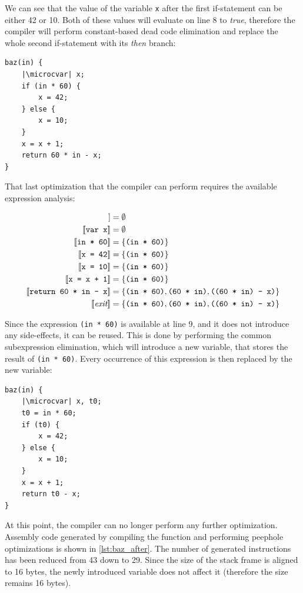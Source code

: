 \documentclass[thesis=M,english]{FITthesis}[2019/12/23]
\newcommand{\microcvar}{\textcolor{codegreen}{\textbf{var}}}
\begin{document}
We can see that the value of the variable \texttt{x} after the first if-statement can be either 42 or 10. Both of these values will evaluate on line 8 to \emph{true}, therefore the compiler will perform constant-based dead code elimination and replace the whole second if-statement with its \emph{then} branch:

\begin{verbatim}
baz(in) {
	|\microcvar| x;
    if (in * 60) {
		x = 42;
	} else {
		x = 10;
	}
	x = x + 1;
	return 60 * in - x;
}
\end{verbatim}

That last optimization that the compiler can perform requires the available expression analysis:

\begin{align*}
    [\![ \emph{entry} ]\!] &= \emptyset\\
    [\![ \texttt{var x} ]\!] &= \emptyset\\
    [\![ \texttt{in * 60} ]\!] &= \{ \texttt{(in * 60)} \}\\
    [\![ \texttt{x = 42} ]\!] &= \{ \texttt{(in * 60)} \}\\
    [\![ \texttt{x = 10} ]\!] &= \{ \texttt{(in * 60)} \}\\
    [\![ \texttt{x = x + 1} ]\!] &= \{ \texttt{(in * 60)} \}\\
    [\![ \texttt{return 60 * in - x} ]\!] &= \{ \texttt{(in * 60)}, \texttt{(60 * in)}, \texttt{((60 * in) - x)} \}\\
    [\![ \emph{exit} ]\!] &= \{ \texttt{(in * 60)}, \texttt{(60 * in)}, \texttt{((60 * in) - x)} \}\\
\end{align*}

Since the expression \texttt{(in * 60)} is available at line 9, and it does not introduce any side-effects, it can be reused. This is done by performing the common subexpression elimination, which will introduce a new variable, that stores the result of \texttt{(in * 60)}. Every occurrence of this expression is then replaced by the new variable:

\begin{verbatim}
baz(in) {
	|\microcvar| x, t0;
	t0 = in * 60;
	if (t0) {
		x = 42;
	} else {
		x = 10;
	}
	x = x + 1;
	return t0 - x;
}
\end{verbatim}

At this point, the compiler can no longer perform any further optimization. Assembly code generated by compiling the function and performing peephole optimizations is shown in \autoref{lst:baz_after}. The number of generated instructions has been reduced from 43 down to 29. Since the size of the stack frame is aligned to 16 bytes, the newly introduced variable does not affect it (therefore the size remains 16 bytes).
\end{document}
